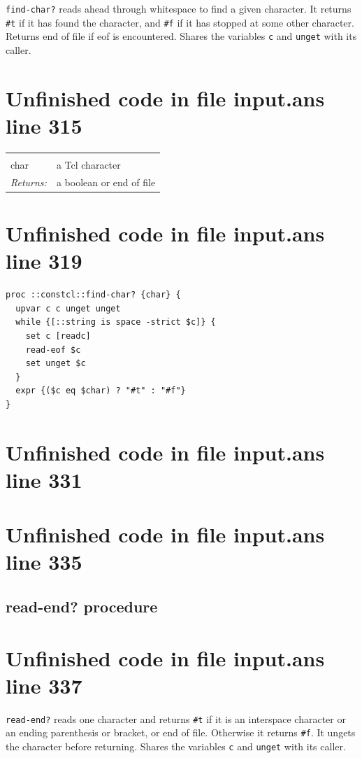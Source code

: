 \documentclass[twoside,9pt]{report}
\begin{document}
\texttt{find-char?} reads ahead through whitespace to find a given character. It returns \texttt{\#t} if it has found the character, and \texttt{\#f} if it has stopped at some other character. Returns end of file if eof is encountered. Shares the variables \texttt{c} and \texttt{unget} with its caller.

\section{Unfinished code in file input.ans line 315}
\noindent\begin{tabular}{ |p{1.9cm} p{8cm}| }
\hline
\rowcolor[HTML]{CCCCCC} \multicolumn{2}{|l|}{\bf find-char? (internal)} \\
char & a Tcl character \\
\textit{Returns:} & a boolean or end of file \\
\hline
\end{tabular}
\section{Unfinished code in file input.ans line 319}
\begin{lstlisting}
proc ::constcl::find-char? {char} {
  upvar c c unget unget
  while {[::string is space -strict $c]} {
    set c [readc]
    read-eof $c
    set unget $c
  }
  expr {($c eq $char) ? "#t" : "#f"}
}
\end{lstlisting}
\section{Unfinished code in file input.ans line 331}
\section{Unfinished code in file input.ans line 335}
\subsection{read-end? procedure}
\label{read-end?-procedure}
\section{Unfinished code in file input.ans line 337}


\texttt{read-end?} reads one character and returns \texttt{\#t} if it is an interspace character or an ending parenthesis or bracket, or end of file. Otherwise it returns \texttt{\#f}. It ungets the character before returning. Shares the variables \texttt{c} and \texttt{unget} with its caller.
\end{document}
